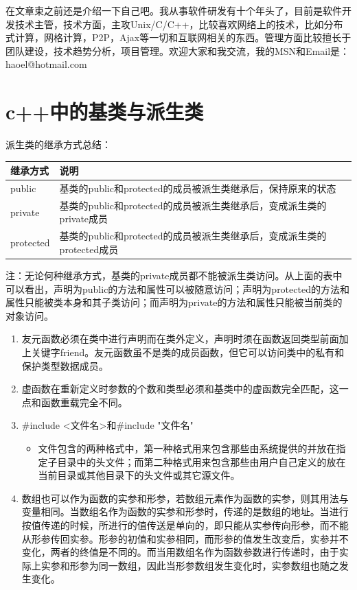 \documentclass{article}
\begin{document}
\begin{CJK}{UTF8}{gbsn}
在文章束之前还是介绍一下自己吧。我从事软件研发有十个年头了，目前是软件开发技术主管，技术方面，主攻Unix/C/C++，比较喜欢网络上的技术，比如分布式计算，网格计算，P2P，Ajax等一切和互联网相关的东西。管理方面比较擅长于团队建设，技术趋势分析，项目管理。欢迎大家和我交流，我的MSN和Email是：haoel@hotmail.com 


\section{c++中的基类与派生类}

派生类的继承方式总结：

\begin{tabular}{|l|l|}
\hline
\hline
继承方式 & 说明\\
\hline
\hline
public & 基类的public和protected的成员被派生类继承后，保持原来的状态\\
\hline
private & 基类的public和protected的成员被派生类继承后，变成派生类的private成员\\
\hline
protected & 基类的public和protected的成员被派生类继承后，变成派生类的protected成员\\
\hline
\hline
\end{tabular}

注：无论何种继承方式，基类的private成员都不能被派生类访问。从上面的表中可以看出，声明为public的方法和属性可以被随意访问；声明为protected的方法和属性只能被类本身和其子类访问；而声明为private的方法和属性只能被当前类的对象访问。 
\begin{enumerate}
\item 友元函数必须在类中进行声明而在类外定义，声明时须在函数返回类型前面加上关键字friend。友元函数虽不是类的成员函数，但它可以访问类中的私有和保护类型数据成员。  
\item 虚函数在重新定义时参数的个数和类型必须和基类中的虚函数完全匹配，这一点和函数重载完全不同。  
\item \#include <文件名>和\#include "文件名"  
\begin{itemize}
\itemsep=-3pt
\item 文件包含的两种格式中，第一种格式用来包含那些由系统提供的并放在指定子目录中的头文件；而第二种格式用来包含那些由用户自己定义的放在当前目录或其他目录下的头文件或其它源文件。  
\end{itemize}
\item 数组也可以作为函数的实参和形参，若数组元素作为函数的实参，则其用法与变量相同。当数组名作为函数的实参和形参时，传递的是数组的地址。当进行按值传递的时候，所进行的值传送是单向的，即只能从实参传向形参，而不能从形参传回实参。形参的初值和实参相同，而形参的值发生改变后，实参并不变化，两者的终值是不同的。而当用数组名作为函数参数进行传递时，由于实际上实参和形参为同一数组，因此当形参数组发生变化时，实参数组也随之发生变化。  


\end{enumerate}
\end{CJK}
\end{document}
